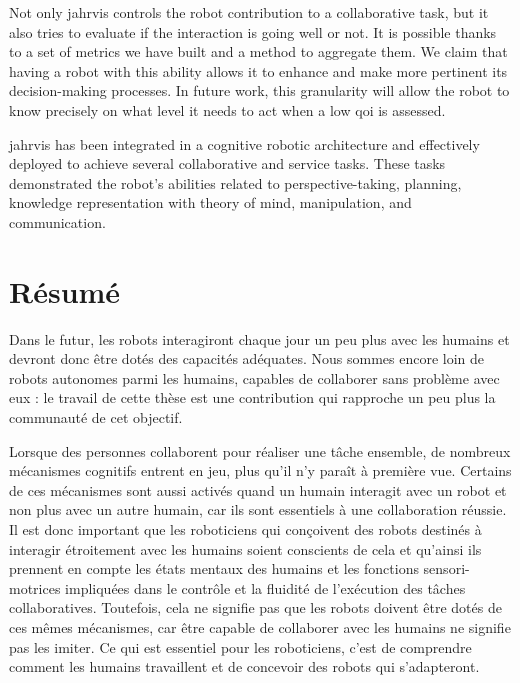\documentclass[english,a4paper,11pt,twoside]{StyleThese}
\begin{document}
Not only \acrshort{jahrvis} controls the robot contribution to a collaborative task, but it also tries to evaluate if the interaction is going well or not. It is possible thanks to a set of metrics we have built and a method to aggregate them. We claim that having a robot with this ability allows it to enhance and make more pertinent its decision-making processes. In future work, this granularity will allow the robot to know precisely on what level it needs to act when a low \acrlong{qoi} is assessed. 

\acrshort{jahrvis} has been integrated in a cognitive robotic architecture and effectively deployed to achieve several collaborative and service tasks. These tasks demonstrated the robot’s abilities related to perspective-taking, planning, knowledge representation with theory of mind, manipulation, and communication.

\clearpage

\chapter*{Résumé}

Dans le futur, les robots interagiront chaque jour un peu plus avec les humains et devront donc être dotés des capacités adéquates. Nous sommes encore loin de robots autonomes parmi les humains, capables de collaborer sans problème avec eux : le travail de cette thèse est une contribution qui rapproche un peu plus la communauté de cet objectif. 


Lorsque des personnes collaborent pour réaliser une tâche ensemble, de nombreux mécanismes cognitifs entrent en jeu, plus qu’il n’y paraît à première vue. Certains de ces mécanismes sont aussi activés quand un humain interagit avec un robot et non plus avec un autre humain, car ils sont essentiels à une collaboration réussie. Il est donc important que les roboticiens qui conçoivent des robots destinés à interagir étroitement avec les humains soient conscients de cela et qu’ainsi ils prennent en compte les états mentaux des humains et les fonctions sensori-motrices impliquées dans le contrôle et la fluidité de l'exécution des tâches collaboratives. Toutefois, cela ne signifie pas que les robots doivent être dotés de ces mêmes mécanismes, car être capable de collaborer avec les humains ne signifie pas les imiter. Ce qui est essentiel pour les roboticiens, c'est de comprendre comment les humains travaillent et de concevoir des robots qui s'adapteront. 
\end{document}
